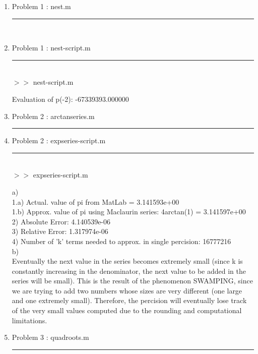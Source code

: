 \documentclass[12pt]{article}
\begin{document}
	\begin{enumerate}
	
	\item[] Problem 1 : nest.m \noindent\rule{\textwidth}{1.0pt} \\
	
	
	\item[] Problem 1 : nest-script.m \noindent\rule{\textwidth}{1.0pt} \\
		
	
	$>>$ nest-script.m 
	\begin{framed}
	Evaluation of p(-2): -67339393.000000
	\end{framed}
	
	\item[] Problem 2 : arctanseries.m \noindent\rule{\textwidth}{1.0pt} 
		
	
	\item[] Problem 2 : expseries-script.m \noindent\rule{\textwidth}{1.0pt} \\
		
	
	$>>$ expseries-script.m 
	\begin{framed}
a)\\
  \tabto{0.5cm}1.a) Actual. value of pi from MatLab = 3.141593e+00\\
   \tabto{0.5cm}1.b) Approx. value of pi using Maclaurin series: 4arctan(1) = 3.141597e+00\\
   \tabto{0.5cm}2) Absolute Error: 4.140539e-06\\
   \tabto{0.5cm}3) Relative Error: 1.317974e-06\\
   \tabto{0.5cm}4) Number of 'k' terms needed to approx. in single percision: 16777216\\
b)\\
   \tabto{0.5cm}Eventually the next value in the series becomes extremely small (since k is constantly increasing in the denominator, the next value to be added in the series will be small). This is the result of the phenomenon SWAMPING, since we are trying to add two numbers whose sizes are very different (one large and one extremely small). Therefore, the percision will eventually lose track of the very small values computed due to the rounding and computational limitations.
	\end{framed}
	\item[] Problem 3 : quadroots.m \noindent\rule{\textwidth}{1.0pt} \\
		
	

\end{enumerate}
\end{document}
